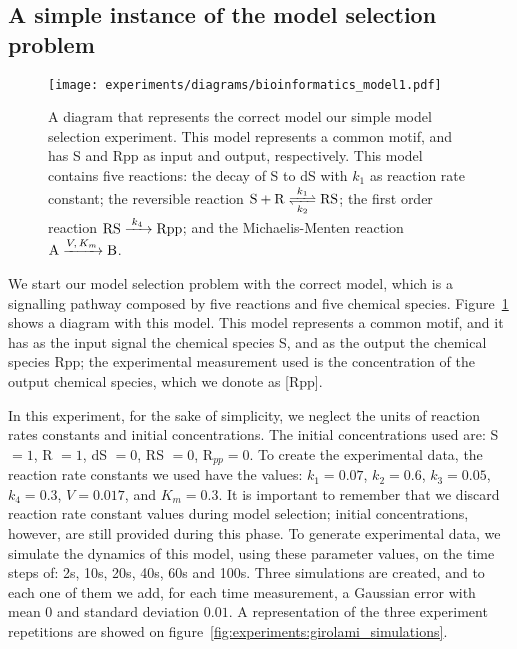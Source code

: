 \subsection{A simple instance of the model selection problem}
\begin{figure}[h]
\begin{center}
    \texttt{[image: experiments/diagrams/bioinformatics\_model1.pdf]}
    \caption{A diagram that represents the correct model our simple
model selection experiment. This model represents a common motif, and
has S and Rpp as input and output, respectively. This model contains
five reactions: the decay of S to dS with $k_1$ as reaction rate
constant; the reversible reaction $\ce{S + R <=>[$k_1$][$k_2$] RS}$; the
first order reaction $\ce{RS ->[$k_4$] Rpp}$; and the Michaelis-Menten
reaction $\ce{A ->[$V, K_m$] B}$.}
    \label{fig:experiments:girolami_model1}
    \end{center}
\end{figure}

We start our model selection problem with the correct model, which is 
a signalling pathway composed by five reactions and five chemical 
species. Figure~\ref{fig:experiments:girolami_model1} shows a diagram
with this model. This model represents a common motif, and it has as the 
input signal the chemical species S, and as the output the chemical 
species Rpp; the experimental measurement used is the concentration of 
the output chemical species, which we donote as [Rpp].


In this experiment, for the sake of simplicity, we neglect the units of 
reaction rates constants and initial concentrations. The initial 
concentrations used are:  S $= 1$, R $= 1$, dS $= 0$, RS $= 0$, 
R$_{pp} = 0$. To create the experimental data, the reaction rate 
constants we used have the values: 
$k_1 = 0.07$, $k_2 = 0.6$, $k_3 = 0.05$, $k_4 = 0.3$, $V = 0.017$, and
$K_m = 0.3$. It is important to remember that we discard reaction rate
constant values during model selection; initial concentrations, however,
are still provided during this phase. To generate experimental data, we
simulate the dynamics of this model, using these parameter values, on
the time steps of: 2s, 10s, 20s, 40s, 60s and 100s. Three simulations
are created, and to each one of them we add, for each time measurement,
a Gaussian error with mean $0$ and standard deviation $0.01$. A
representation of the three experiment repetitions are showed on 
figure~\ref{fig:experiments:girolami_simulations}.

